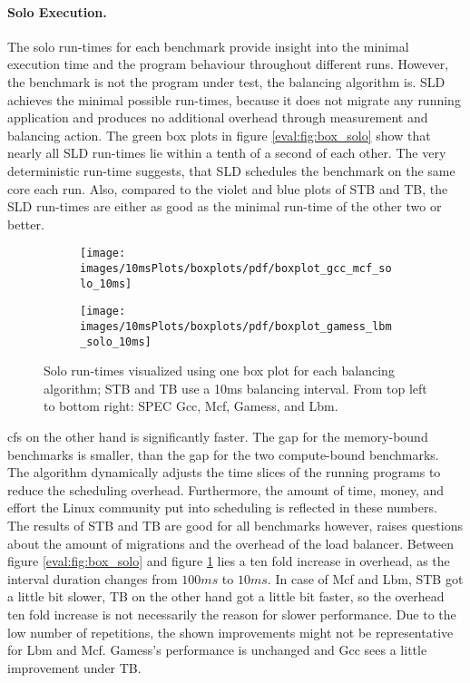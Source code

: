 \paragraph{Solo Execution.}
The solo run-times for each benchmark provide insight into the minimal
execution time and the program behaviour throughout different runs.
However, the benchmark is not the program under test, the balancing algorithm
is.
SLD achieves the minimal possible run-times, because it does not
migrate any running application and produces no additional overhead through
measurement and balancing action.
The green box plots in figure \ref{eval:fig:box_solo} show that nearly all SLD
run-times lie within a tenth of a second of each other.
The very deterministic run-time suggests, that SLD schedules the benchmark on
the same core each run.
Also, compared to the violet and blue plots of STB and TB, the SLD run-times
are either as good as the minimal run-time of the other two or better.
\\

\begin{figure}[!ht]
  \begin{subfigure}{\textwidth}
  \texttt{[image: images/10msPlots/boxplots/pdf/boxplot\_gcc\_mcf\_solo\_10ms]}
  \end{subfigure}
  \begin{subfigure}{\textwidth}
  \texttt{[image: images/10msPlots/boxplots/pdf/boxplot\_gamess\_lbm\_solo\_10ms]}
  \end{subfigure}
  \caption{Solo run-times visualized using one box plot for each balancing
    algorithm; STB and TB use a 10ms balancing interval.
    From top left to bottom right: SPEC Gcc, Mcf, Gamess, and Lbm.}
  \label{eval:fig:box_solo_10ms}
\end{figure}


\Gls{cfs} on the other hand is significantly faster.
The gap for the memory-bound benchmarks is smaller, than the gap for
the two compute-bound benchmarks.
The algorithm dynamically adjusts the time slices of the running programs to reduce
the scheduling overhead.
Furthermore, the amount of time, money, and effort the Linux community put into
scheduling is reflected in these numbers.
\\

The results of STB and TB are good for all benchmarks however,
raises questions about the amount of migrations and the overhead of the load
balancer.
Between figure \ref{eval:fig:box_solo} and figure \ref{eval:fig:box_solo_10ms}
lies a ten fold increase in overhead, as the interval duration changes from
$100ms$ to $10ms$.
In case of Mcf and Lbm, STB got a little bit slower, TB on the other hand got a
little bit faster, so the overhead ten fold increase is not necessarily the
reason for slower performance.
Due to the low number of repetitions, the shown improvements might not be
representative for Lbm and Mcf.
Gamess's performance is unchanged and Gcc sees a little improvement under TB.

